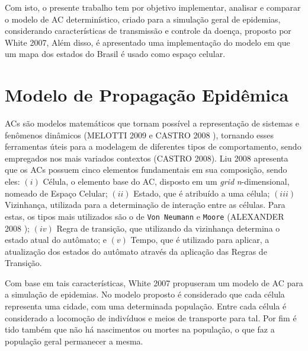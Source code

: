 \documentclass[a4paper,12pt]{article}
\begin{document}
Com isto, o presente trabalho tem por objetivo implementar, analisar e comparar o modelo de AC determinístico, criado para a simulação geral de epidemias, considerando características de transmissão e controle da doença, proposto por White 2007\cite{White2007}, Além disso, é apresentado uma implementação do modelo em que um mapa dos estados do Brasil é usado como espaço celular.

\section{Modelo de Propagação Epidêmica}

\par ACs são modelos matemáticos que tornam possível a representação de sistemas e fenômenos dinâmicos (MELOTTI 2009 \cite{Melotti2009} e CASTRO 2008 \cite{Castro2008}), tornando esses ferramentas úteis para a modelagem de diferentes tipos de comportamento, sendo empregados nos mais variados contextos (CASTRO 2008\cite{Castro2008}). Liu 2008 \cite{Liu2008} apresenta que os ACs possuem cinco elementos fundamentais em sua composição, sendo eles: $(i)$ Célula, o elemento base do AC, disposto em um \textit{grid} \textit{n}-dimensional, nomeado de Espaço Celular; $(ii)$ Estado, que é atribuído a uma célula; $(iii)$ Vizinhança, utilizada para a determinação de interação entre as células. Para estas, os tipos mais utilizados são o de \texttt{Von Neumann} e \texttt{Moore} (ALEXANDER 2008 \cite{alexanderschatten2008}); $(iv)$ Regra de transição, que utilizando da vizinhança determina o estado atual do autômato; e $(v)$ Tempo, que é utilizado para aplicar, a atualização dos estados do autômato através da aplicação das Regras de Transição. 

Com base em tais características, White 2007\cite{White2007} propuseram um modelo de AC para a simulação de epidemias. No modelo proposto é considerado que cada célula representa uma cidade, com uma determinada população. Entre cada célula é considerado a locomoção de indivíduos e meios de transporte para tal. Por fim é tido também que não há nascimentos ou mortes na população, o que faz a população geral permanecer a mesma.
\end{document}
